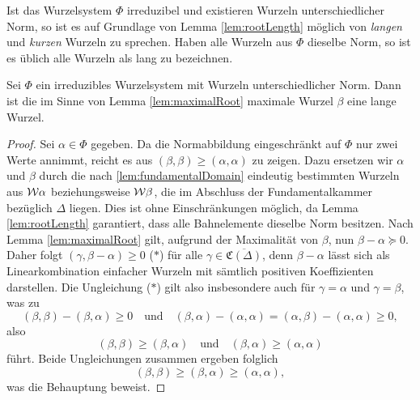 \begin{bem}
  Ist das Wurzelsystem $\Phi$ irreduzibel und existieren Wurzeln unterschiedlicher Norm, so ist es auf Grundlage von Lemma \ref{lem:rootLength} möglich von \emph{langen} und \emph{kurzen} Wurzeln zu sprechen.
  Haben alle Wurzeln aus $\Phi$ dieselbe Norm, so ist es üblich alle Wurzeln als lang zu bezeichnen.
\end{bem}

\begin{lem}
  Sei $\Phi$ ein irreduzibles Wurzelsystem mit Wurzeln unterschiedlicher Norm.
  Dann ist die im Sinne von Lemma \ref{lem:maximalRoot} maximale Wurzel $\beta$ eine lange Wurzel.
\end{lem}

\begin{proof}
  Sei $\alpha \in \Phi$ gegeben.
  Da die Normabbildung eingeschränkt auf $\Phi$ nur zwei Werte annimmt, reicht es aus $(\beta, \beta) \geq (\alpha, \alpha)$ zu zeigen.
  Dazu ersetzen wir $\alpha$ und $\beta$ durch die nach \ref{lem:fundamentalDomain} eindeutig bestimmten Wurzeln aus $\mathcal{W}\alpha$ beziehungsweise $\mathcal{W}\beta$, die im Abschluss der Fundamentalkammer bezüglich $\Delta$ liegen. 
  Dies ist ohne Einschränkungen möglich, da Lemma \ref{lem:rootLength} garantiert, dass alle Bahnelemente dieselbe Norm besitzen.
  Nach Lemma \ref{lem:maximalRoot} gilt, aufgrund der Maximalität von $\beta$, nun $\beta - \alpha \succeq 0$.
  Daher folgt $(\gamma, \beta - \alpha) \geq 0$ ($\ast$) für alle $\gamma \in \overline{\mathfrak{C}(\Delta)}$, denn $\beta - \alpha$ lässt sich als Linearkombination einfacher Wurzeln mit sämtlich positiven Koeffizienten darstellen.
  Die Ungleichung ($\ast$) gilt also insbesondere auch für $\gamma = \alpha$ und $\gamma = \beta$, was zu 
  \begin{displaymath}
    (\beta, \beta) - (\beta, \alpha) \geq 0 \quad\text{und}\quad 
    (\beta, \alpha) - (\alpha, \alpha) 
    = (\alpha, \beta) - (\alpha, \alpha) \geq 0,
  \end{displaymath}
  also
  \begin{displaymath}
    (\beta, \beta)  \geq (\beta, \alpha) \quad\text{und}\quad 
    (\beta, \alpha) \geq (\alpha, \alpha)
  \end{displaymath}
  führt.
  Beide Ungleichungen zusammen ergeben folglich
  \begin{displaymath}
    (\beta, \beta) \geq (\beta, \alpha) \geq (\alpha, \alpha),
  \end{displaymath}
  was die Behauptung beweist.
\end{proof}
